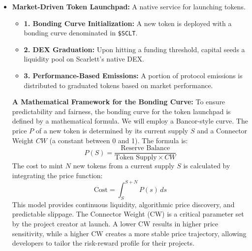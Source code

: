 \documentclass[10pt]{article}
\begin{document}
\begin{itemize}[leftmargin=*, itemsep=2pt]
    \item \textbf{Market-Driven Token Launchpad:} A native service for launching tokens.
    \begin{itemize}[leftmargin=*, itemsep=2pt]
        \item \textbf{1. Bonding Curve Initialization:} A new token is deployed with a bonding curve denominated in \texttt{\$SCLT}.
        \item \textbf{2. DEX Graduation:} Upon hitting a funding threshold, capital seeds a liquidity pool on Scarlett's native DEX.
        \item \textbf{3. Performance-Based Emissions:} A portion of protocol emissions is distributed to graduated tokens based on market performance.
    \end{itemize}
    
    \textbf{A Mathematical Framework for the Bonding Curve:} To ensure predictability and fairness, the bonding curve for the token launchpad is defined by a mathematical formula. We will employ a Bancor-style curve. The price \(P\) of a new token is determined by its current supply \(S\) and a Connector Weight \(CW\) (a constant between 0 and 1). The formula is:
    \[ P(S) = \frac{\text{Reserve Balance}}{\text{Token Supply} \times CW} \]
    The cost to mint \(N\) new tokens from a current supply \(S\) is calculated by integrating the price function:
    \[ \text{Cost} = \int_{S}^{S+N} P(s) \,ds \]
    This model provides continuous liquidity, algorithmic price discovery, and predictable slippage. The Connector Weight (CW) is a critical parameter set by the project creator at launch. A lower CW results in higher price sensitivity, while a higher CW creates a more stable price trajectory, allowing developers to tailor the risk-reward profile for their projects.


\end{itemize}
\end{document}
